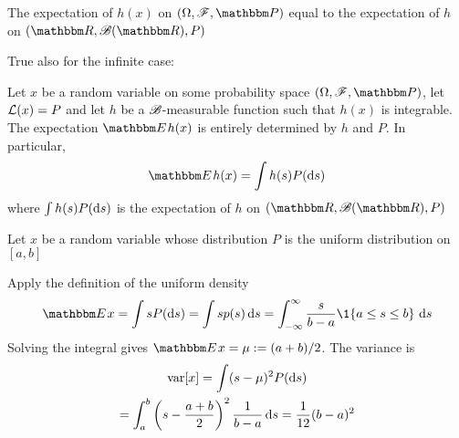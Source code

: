 \begin{frame}
       
    \vspace{2em}
   The expectation of $h(x)$ on $(\Omega, \fF, \PP)$  equal to the 
   expectation of $h$ on $(\RR, \bB(\RR), P)$
   
   True also for the infinite case:
   
   \vspace{1em}
   \Fact
    Let $x$ be a random variable on some probability space $(\Omega, \fF,
    \PP)$, let $\mathcal L(x) = P$ and let $h$ be a $\mathscr B$-measurable function such
    that $h(x)$ is integrable. The expectation $\EE h(x)$ is entirely
    determined by $h$ and $P$.  In particular,
    \begin{equation*}
        \EE h(x) = \int h(s) P(\diff s)
    \end{equation*}
    where $\int h(s) P(\mathop{}\!\mathrm{d} s)$ is the expectation of $h$ on $(\RR, \bB(\RR), P)$

\end{frame}

\begin{frame}

    \vspace{2em}
    \Eg
    Let $x$ be a random variable whose distribution $P$ is the uniform
    distribution on $[a, b]$
    
    \vspace{.7em}
    Apply the definition of the uniform density
    \begin{equation*}
        \EE x 
        = \int s P(\diff s) 
        = \int s p(s) \diff s 
        = \int_{-\infty}^{\infty} 
         \frac{s}{b - a} \1\{a \leq s \leq b\} \, \diff s 
    \end{equation*}
    Solving the integral gives $\EE x = \mu := (a + b)/2$.  The variance is 
    \begin{multline*}
        \operatorname{var} [x]
        = \int (s - \mu)^2 P(\mathop{}\!\mathrm{d} s)
        \\ = \int_a^b
            \left(s -\frac{a + b}{2} \right)^2
            \frac{1}{b - a} \mathop{}\!\mathrm{d} s
        = \frac{1}{12} (b-a)^2
    \end{multline*}
    
\end{frame}



